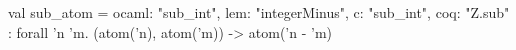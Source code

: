 val sub_atom = {ocaml: "sub_int", lem: "integerMinus", c: "sub_int", coq: "Z.sub"} : forall 'n 'm.
  (atom('n), atom('m)) -> atom('n - 'm)
